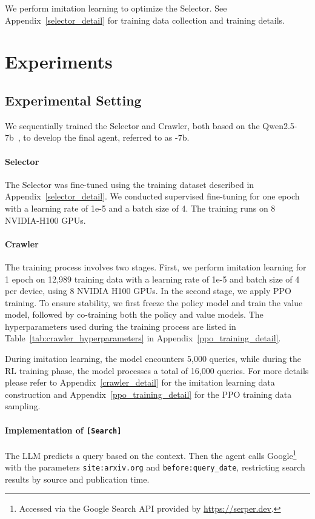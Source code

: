 We perform imitation learning to optimize the Selector. See Appendix~\ref{selector_detail} for training data collection and training details.

\section{Experiments}

\subsection{Experimental Setting}\label{experimental_setting}

We sequentially trained the Selector and Crawler, both based on the Qwen2.5-7b~\cite{yang2024qwen2}, to develop the final agent, referred to as \pasa-7b. 

\paragraph{Selector}

The Selector was fine-tuned using the training dataset described in Appendix~\ref{selector_detail}. We conducted supervised fine-tuning for one epoch with a learning rate of 1e-5 and a batch size of 4. The training runs on 8 NVIDIA-H100 GPUs.

\paragraph{Crawler}
The training process involves two stages. First, we perform imitation learning for 1 epoch on 12,989 training data with a learning rate of 1e-5 and batch size of 4 per device, using 8 NVIDIA H100 GPUs. In the second stage, we apply PPO training. To ensure stability, we first freeze the policy model and train the value model, followed by co-training both the policy and value models. The hyperparameters used during the training process are listed in Table~\ref{tab:crawler_hyperparameters} in Appendix~\ref{ppo_training_detail}. 

During imitation learning, the model encounters 5,000 queries, while during the RL training phase, the model processes a total of 16,000 queries. For more details please refer to Appendix~\ref{crawler_detail} for the imitation learning data construction and Appendix~\ref{ppo_training_detail} for the PPO training data sampling.

\paragraph{Implementation of \texttt{[Search]}}
The LLM predicts a query based on the context. Then the agent calls Google\footnote{Accessed via the Google Search API provided by \url{https://serper.dev}.\label{serper_api}} with the parameters \texttt{site:arxiv.org} and \texttt{before:query\_date}, restricting search results by source and publication time. 

